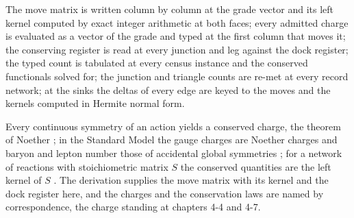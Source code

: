 The move matrix is written column by column at the grade vector and its left kernel computed by exact integer arithmetic at both faces; every admitted charge is evaluated as a vector of the grade and typed at the first column that moves it; the conserving register is read at every junction and leg against the dock register; the typed count is tabulated at every census instance and the conserved functionals solved for; the junction and triangle counts are re-met at every record network; at the sinks the deltas of every edge are keyed to the moves and the kernels computed in Hermite normal form.

\begin{chbridge}
Every continuous symmetry of an action yields a conserved charge, the theorem of Noether \cite{Noether1918}; in the Standard Model the gauge charges are Noether charges and baryon and lepton number those of accidental global symmetries \cite{Weinberg1967}; for a network of reactions with stoichiometric matrix $S$ the conserved quantities are the left kernel of $S$ \cite{Feinberg1987}. The derivation supplies the move matrix with its kernel and the dock register here, and the charges and the conservation laws are named by correspondence, the charge standing at chapters 4-4 and 4-7.
\end{chbridge}
